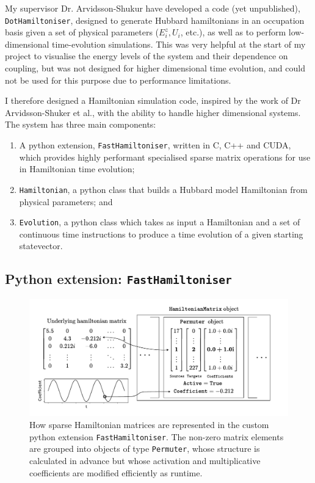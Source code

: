 \documentclass{report}
\begin{document}
My supervisor Dr. Arvidsson-Shukur have developed a code (yet unpublished), \texttt{DotHamiltoniser}, designed to generate Hubbard hamiltonians in an occupation basis given a set of physical parameters ($E_i^z, U_i$, etc.), as well as to perform low-dimensional time-evolution simulations. This was very helpful at the start of my project to visualise the energy levels of the system and their dependence on coupling, but was not designed for higher dimensional time evolution, and could not be used for this purpose due to performance limitations.

I therefore designed a Hamiltonian simulation code, inspired by the work of Dr Arvidsson-Shuker et al., with the ability to handle higher dimensional systems. The system has three main components: 
\begin{enumerate}
    \item A python extension, \texttt{FastHamiltoniser}, written in C, C++ and CUDA, which provides highly performant specialised sparse matrix operations for use in Hamiltonian time evolution;
    \item \texttt{Hamiltonian}, a python class that builds a Hubbard model Hamiltonian from physical parameters; and
    \item \texttt{Evolution}, a python class which takes as input a Hamiltonian and a set of continuous time instructions to produce a time evolution of a given starting statevector.
\end{enumerate}
\subsection{Python extension: \texttt{FastHamiltoniser}}
\begin{figure}[h]
    \centering
    \includegraphics[scale = 0.8]{Figures/fasthamiltoniser/diagram.pdf}
    \caption{How sparse Hamiltonian matrices are represented in the custom python extension \texttt{FastHamiltoniser}. The non-zero matrix elements are grouped into objects of type \texttt{Permuter}, whose structure is calculated in advance but whose activation and multiplicative coefficients are modified efficiently as runtime.}
    \label{fig:fasthamiltoniser}
\end{figure}
\end{document}
